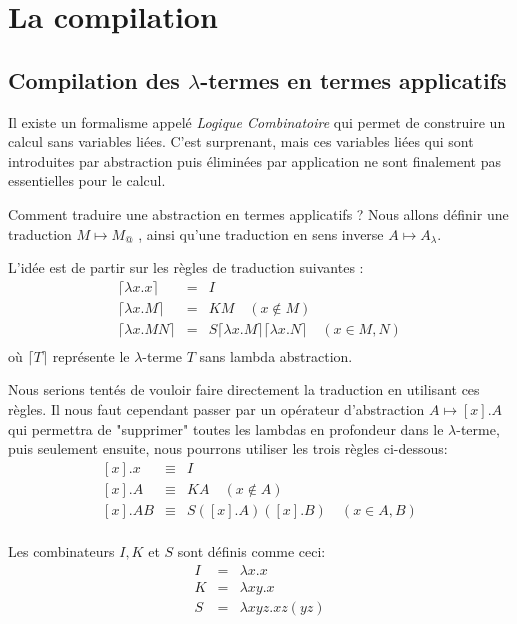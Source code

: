 \chapter{La compilation}
\section{Compilation des $\lambda$-termes en termes applicatifs}
Il existe un formalisme appelé \textit{Logique Combinatoire} qui permet de construire
un calcul sans variables liées. 
C'est surprenant, mais ces variables liées qui sont introduites par abstraction puis éliminées par application
ne sont finalement pas essentielles pour le calcul.

Comment traduire une abstraction en termes applicatifs ? 
Nous allons définir une traduction $M\mapsto  M_@$ , ainsi qu'une traduction en sens inverse
$A\mapsto A_\lambda$.

L'idée est de partir sur les règles de traduction suivantes :
\[
\begin{array}{lcl}
	\lceil \lambda x . x \rceil &=& I \\
	\lceil \lambda x . M \rceil &=& K M \quad (x \notin M) \\
	\lceil \lambda x . M N \rceil &=& S \lceil \lambda x . M \rceil \lceil \lambda x . N \rceil \quad (x \in M,N) \\
\end{array}
\]
où $ \lceil T \rceil$ représente le $\lambda$-terme $T$ sans lambda abstraction. 

Nous serions tentés de vouloir faire directement la traduction en utilisant ces règles.
Il nous faut cependant passer par un opérateur d'abstraction $A \mapsto [x].A$ qui permettra de "supprimer" toutes 
les lambdas en profondeur dans le $\lambda$-terme, puis seulement ensuite, nous pourrons utiliser les trois règles ci-dessous:
\[
\begin{array}{lcl}
	{[x]}  . x   &\equiv & I \\
	{[x]} .  A   &\equiv & K A \quad (x \notin A) \\
	{[x]}  . A B &\equiv & S ([x] . A)([x] . B)  \quad (x \in A,B) \\
\end{array}
\]

Les combinateurs $I, K$ et $S$ sont définis comme ceci:
\[
\begin{array}{ccc}
	I &=& \lambda x . x \\
	K &=& \lambda x y . x \\
	S &=& \lambda x y z . x z (y z) \\
\end{array}	
\]

